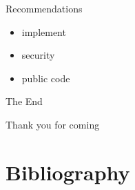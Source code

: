 \documentclass{beamer}
\begin{document}
\begin{frame}{Recommendations}
  \begin{itemize}   
    \item implement
    \item security
    \item public code
  \end{itemize}
\end{frame}

\begin{frame}
\Huge{\centerline{The End}}
\small{\centerline{Thank you for coming}}
\end{frame}

\section{Bibliography}

\begin{frame}[allowframebreaks]
\printbibliography[heading=none]
\end{frame}
\end{document}
